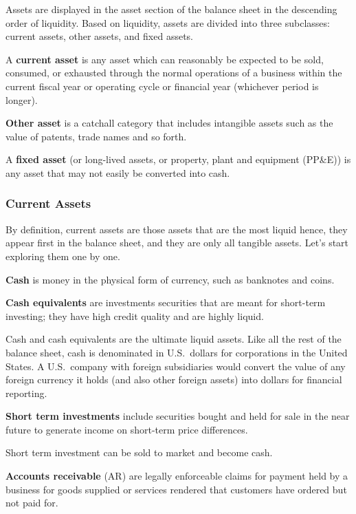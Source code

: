 Assets are displayed in the asset section of the balance sheet in the descending order of liquidity. Based on liquidity,
assets are divided into three subclasses: current assets, other assets, and fixed assets.

A \textbf{current asset} is any asset which can reasonably be expected to be sold, consumed, or exhausted through the
normal operations of a business within the current fiscal year or operating cycle or financial year (whichever period is
longer).
\ed

\textbf{Other asset} is a catchall category that includes intangible assets such as the value of patents, trade names
and so forth.
\ed

A \textbf{fixed asset} (or long-lived assets, or property, plant and equipment (PP\&E)) is any asset that may not
easily be converted into cash.
\ed

\subsubsection{Current Assets}

By definition, current assets are those assets that are the most liquid hence, they appear first in the balance sheet,
and they are only all tangible assets. Let's start exploring them one by one.

\bd[Cash]
\textbf{Cash} is money in the physical form of currency, such as banknotes and coins.
\ed

\textbf{Cash equivalents} are investments securities that are meant for short-term investing; they have high credit
quality and are highly liquid.
\ed

Cash and cash equivalents are the ultimate liquid assets. Like all the rest of the balance sheet, cash is denominated
in U.S.\ dollars for corporations in the United States. A U.S.\ company with foreign subsidiaries would convert the
value of any foreign currency it holds (and also other foreign assets) into dollars for financial reporting.

\textbf{Short term investments} include securities bought and held for sale in the near future to generate income on
short-term price differences.
\ed

Short term investment can be sold to market and become cash.

\textbf{Accounts receivable} (AR) are legally enforceable claims for payment held by a business for goods supplied or
services rendered that customers have ordered but not paid for.
\ed

